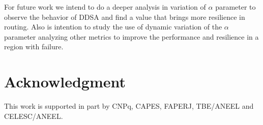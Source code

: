 \documentclass[conference]{IEEEtran}
\begin{document}
For future work we intend to do a deeper analysis in variation of $\alpha$ parameter to observe the behavior of DDSA and find a value that brings more resilience in routing. 
Also is intention to study the use of dynamic variation of the $\alpha$ parameter analyzing other metrics to improve the performance and resilience in a region with failure.



%



\section*{Acknowledgment}


This work is supported in part by CNPq, CAPES, FAPERJ, TBE/ANEEL and CELESC/ANEEL.


\ifCLASSOPTIONcaptionsoff
  \newpage
\fi



\end{document}
